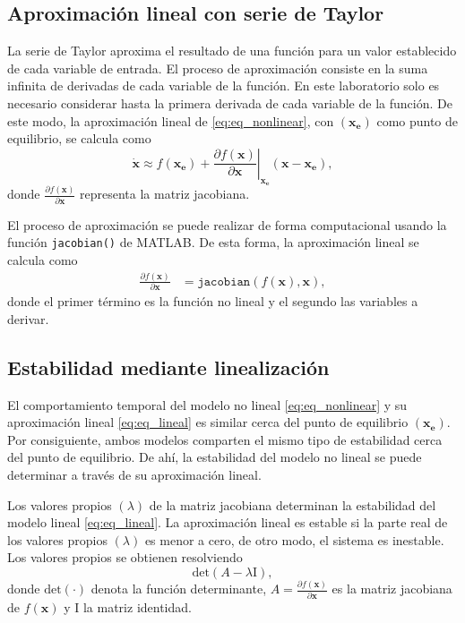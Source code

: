 	\subsection{Aproximación lineal con serie de Taylor}
	La serie de Taylor aproxima el resultado de una función para un valor establecido de cada variable de entrada. El proceso de aproximación consiste en la suma infinita de derivadas de cada variable de la función. En este laboratorio solo es necesario considerar hasta la primera derivada de cada variable de la función. De este modo, la aproximación lineal de \eqref{eq:eq_nonlinear}, con $(\mathbf{x_e})$ como punto de equilibrio, se calcula como
	\begin{equation}
		\mathbf{\dot{x}} \approx  
		f(\mathbf{x_e}) + 
		\left. \frac{\partial{f(\mathbf{x})}}{\partial{\mathbf{x}}} \right\vert_{\mathbf{x_e}} (\mathbf{x}-\mathbf{x_e}),
		\label{eq:eq_lineal}
	\end{equation}
	donde $\frac{\partial{f(\mathbf{x})}}{\partial{\mathbf{x}}}$ representa la matriz jacobiana.
	
	El proceso de aproximación se puede realizar de forma computacional usando la función \texttt{jacobian()} de MATLAB. De esta forma, la aproximación lineal se calcula como 
	\begin{align*}
		\frac{\partial{f(\mathbf{x})}}{\partial{\mathbf{x}}} &=
		\texttt{jacobian}(f(\mathbf{x}), \mathbf{x}),
	\end{align*}
	\noindent donde el primer término es la función no lineal y el segundo las variables a derivar.
	
	\subsection{Estabilidad mediante linealización}
	El comportamiento temporal del modelo no lineal \eqref{eq:eq_nonlinear} y su aproximación lineal \eqref{eq:eq_lineal} es similar cerca del punto de equilibrio $(\mathbf{x_e})$. Por consiguiente, ambos modelos comparten el mismo tipo de estabilidad cerca del punto de equilibrio. De ahí, la estabilidad del modelo no lineal se puede determinar a través de su aproximación lineal.
	
	Los valores propios $(\lambda)$ de la matriz jacobiana determinan la estabilidad del modelo lineal \eqref{eq:eq_lineal}. La aproximación lineal es estable si la parte real de los valores propios $(\lambda)$ es menor a cero, de otro modo, el sistema es inestable. Los valores propios se obtienen resolviendo
	\begin{equation}
		\mathrm{det}\left(A - \lambda \mathrm{I} \right),
	\end{equation}
	\noindent donde $\mathrm{det(\cdot)}$ denota la función determinante, $A=\frac{\partial{f(\mathbf{x})}}{\partial{\mathbf{x}}}$ es la matriz jacobiana de $f(\mathbf{x})$ y $\mathrm{I}$ la matriz identidad.
	

